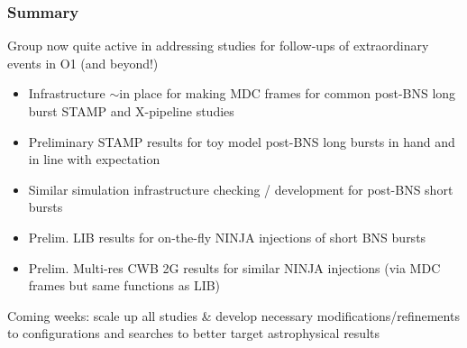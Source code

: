 \documentclass{beamer}
\begin{document}
\begin{frame}
    \frametitle{Summary}
    {\small 
    Group now quite active in addressing studies for follow-ups of extraordinary
    events in O1 (and beyond!)
    \begin{itemize}
        \item Infrastructure $\sim$in place for making MDC frames
            for common post-BNS long burst STAMP and X-pipeline studies
        \item Preliminary STAMP results for toy model post-BNS long bursts in
            hand and in line with expectation
        \item Similar simulation infrastructure checking / development for
            post-BNS short bursts
        \item Prelim. LIB results for on-the-fly NINJA injections of short
            BNS bursts
        \item Prelim. Multi-res CWB 2G results for similar NINJA injections (via
            MDC frames but same functions as LIB)
    \end{itemize}
    Coming weeks: scale up all studies \& develop necessary
    modifications/refinements to configurations and searches to better target
    astrophysical results
}

\end{frame}
\end{document}
